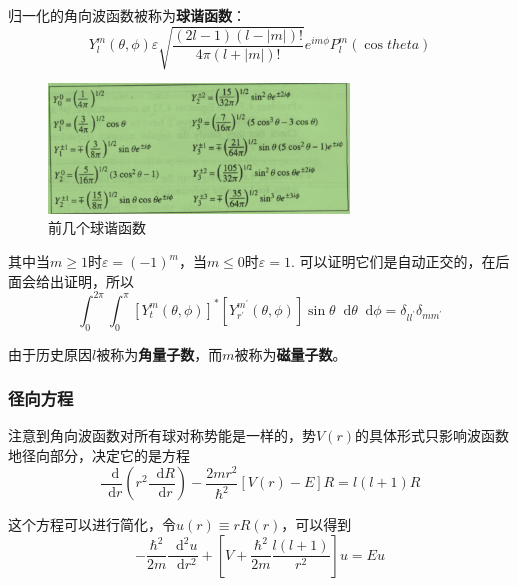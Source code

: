 \documentclass[UTF8]{ctexart}
\begin{document}
    归一化的角向波函数被称为\textbf{球谐函数}：
    \begin{equation}
        Y_l^m(\theta,\phi) \varepsilon \sqrt{\frac{(2l-1)(l-|m|)!}{4 \pi (l+|m|)!}} e^{im\phi} P_l^m(\cos theta)
    \end{equation}

    \begin{figure}[htb]
        \centering
        \includegraphics[width=8cm]{figure4-2.png}
        \caption{前几个球谐函数}
        \label{figure4.2}
    \end{figure}
    
\noindent 其中当$m \ge 1$时$\varepsilon = (-1)^m$，当$m \le 0$时$\varepsilon =1$. 可以证明它们是自动正交的，在后面会给出证明，所以
\begin{equation}
    \int_{0}^{2 \pi} \int_{0}^{\pi}\left[Y_{t}^{m}(\theta, \phi)\right]^{*}\left[Y_{r^{\prime}}^{m^{\prime}}(\theta, \phi)\right] \sin \theta \mathop{}\!\mathrm{d}  \theta \mathop{}\!\mathrm{d}  \phi=\delta_{ll^{\prime}} \delta_{m m^{\prime}}
    \end{equation}

\noindent 由于历史原因$l$被称为\textbf{角量子数}，而$m$被称为\textbf{磁量子数}。

    \subsubsection{径向方程}
    注意到角向波函数对所有球对称势能是一样的，势$V(r)$的具体形式只影响波函数地径向部分，决定它的是方程
    \begin{equation}
        \frac{\mathop{}\!\mathrm{d} }{\mathop{}\!\mathrm{d} r} \left(r^2 \frac{\mathop{}\!\mathrm{d} R}{\mathop{}\!\mathrm{d} r}\right) - \frac{2 m r^2}{\hbar^2} \left[V(r) - E\right]R =l(l+1)R
    \end{equation}

\noindent 这个方程可以进行简化，令$u(r) \equiv r R(r)$，可以得到
\begin{equation}
    - \frac{\hbar^2}{2m} \frac{\mathop{}\!\mathrm{d}^2 u}{\mathop{}\!\mathrm{d} r^2} + \left[V + \frac{\hbar^2}{2m}\frac{l(l+1)}{r^2}\right] u =E u
\end{equation}
\end{document}
